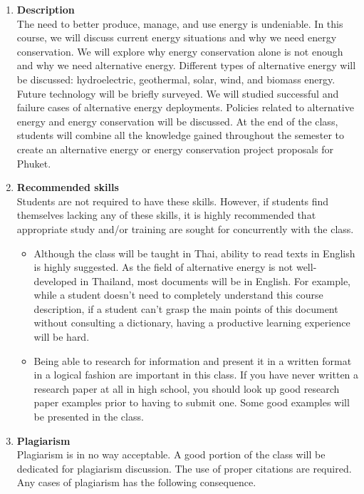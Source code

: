\documentclass[a4paper,12pt]{article}
\begin{document}
\begin{enumerate}[label=\textbf{\Alph*}]
    \item \textbf{Description} \hfill \\
    The need to better produce, manage, and use energy is undeniable. In this course, we will discuss current energy situations and why we need energy conservation. We will explore why energy conservation alone is not enough and why we need alternative energy. Different types of alternative energy will be discussed: hydroelectric, geothermal, solar, wind, and biomass energy. Future technology will be briefly surveyed. We will studied successful and failure cases of alternative energy deployments. Policies related to alternative energy and energy conservation will be discussed. At the end of the class, students will combine all the knowledge gained throughout the semester to create an alternative energy or energy conservation project proposals for Phuket.
    \item \textbf{Recommended skills} \hfill \\
        Students are not required to have these skills. However, if students find themselves lacking any of these skills, it is highly recommended that appropriate study and/or training are sought for concurrently with the class.
        \begin{itemize}
            \item Although the class will be taught in Thai, ability to read texts in English is highly suggested. As the field of alternative energy is not well-developed in Thailand, most documents will be in English. For example, while a student doesn't need to completely understand this course description, if a student can't grasp the main points of this document without consulting a dictionary, having a productive learning experience will be hard. 
            \item Being able to research for information and present it in a written format in a logical fashion are important in this class. If you have never written a research paper at all in high school, you should look up good research paper examples prior to having to submit one. Some good examples will be presented in the class.
        \end{itemize}
    \item \textbf{Plagiarism} \hfill \\
        Plagiarism is in no way acceptable. A good portion of the class will be dedicated for plagiarism discussion. The use of proper citations are required. Any cases of plagiarism has the following consequence.

\end{enumerate}
\end{document}
